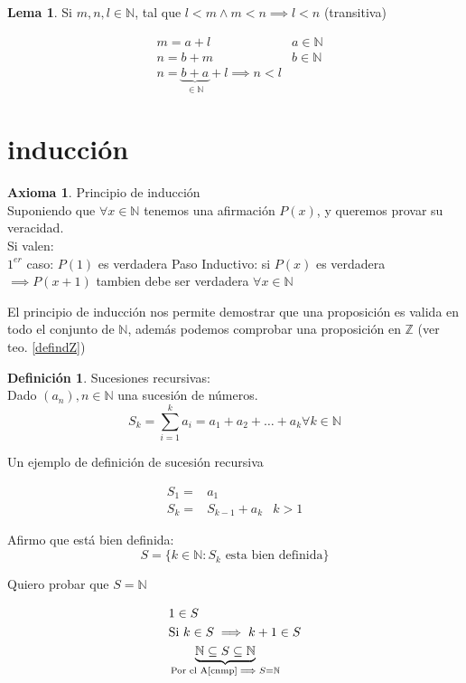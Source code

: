 \documentclass[9pt,a4paper,draft]{article}
\theoremstyle{definition}
\newtheorem{defi}{Definición}
\newtheorem{axi}{Axioma}
\newtheorem{lema}{Lema}
\theoremstyle{plain}
\begin{document}
\begin{lema}
Si $m,n,l\in\mathbb{N}$, tal que $l<m\land m<n\implies l<n$ (transitiva)

\begin{align*}
& m = a+l   & a\in\mathbb{N} \\
& n = b+m   & b\in\mathbb{N} \\
& n = \underbrace{b+a}_{\in{\mathbb{N}}}+l \implies n<l
\end{align*}
\end{lema}

\section{inducción}

\begin{axi}\label{defindN} Principio de inducción\\
Suponiendo que $\forall x\in{\mathbb{N}}$ tenemos una afirmación $P(x)$, y queremos provar su veracidad.\\
Si valen:\\
$1^{er}$ caso: $P(1)$ es verdadera
Paso Inductivo: si $P(x)$ es verdadera $\implies P(x+1)$ tambien debe ser verdadera $\forall x\in{\mathbb{N}}$
\end{axi}

El principio de inducción nos permite demostrar que una proposición es valida en todo el conjunto de $\mathbb{N}$, además podemos comprobar una proposición en $\mathbb{Z}$ (ver teo. \ref{defindZ})

\begin{defi} Sucesiones recursivas:\\
Dado $(a_n), n\in\mathbb{N}$ una sucesión de números.\\
$$S_k = \sum_{i=1}^{k}a_i = a_1 + a_2 + \dots + a_k \forall k\in{\mathbb{N}}$$
\end{defi}

Un ejemplo de definición de sucesión recursiva

\begin{align*}
S_1 = & a_1 \\
S_k = & S_{k-1} + a_k & k>1
\end{align*}

Afirmo que está bien definida:\\

$$S=\{k\in{\mathbb{N}}: S_k \text{ esta bien definida}\}$$

Quiero probar que $S=\mathbb{N}$

\begin{align*}
& 1 \in S \\
& \text{Si } k\in{S}\implies k+1\in{S}\\
& \underbrace{\mathbb{N}\subseteq S \subseteq\mathbb{N}}_{\text{Por el A\ref{cnmp}}\implies S=\mathbb{N}}
\end{align*}
\end{document}
